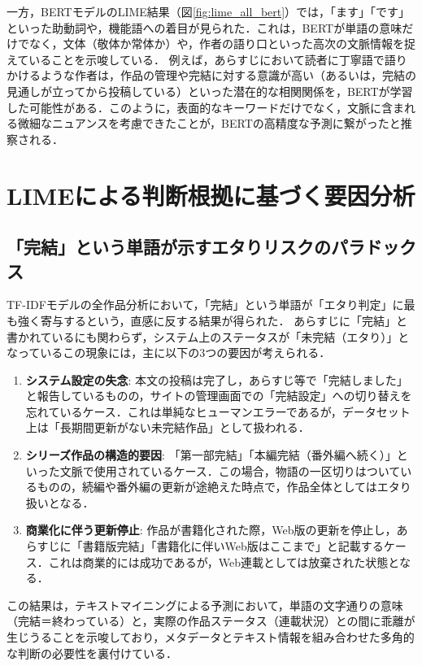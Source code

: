 \documentclass[uplatex, dvipdfmx, 11pt, a4paper, report]{jsbook}
\begin{document}
一方，BERTモデルのLIME結果（図\ref{fig:lime_all_bert}）では，「ます」「です」といった助動詞や，機能語への着目が見られた．これは，BERTが単語の意味だけでなく，文体（敬体か常体か）や，作者の語り口といった高次の文脈情報を捉えていることを示唆している．
例えば，あらすじにおいて読者に丁寧語で語りかけるような作者は，作品の管理や完結に対する意識が高い（あるいは，完結の見通しが立ってから投稿している）といった潜在的な相関関係を，BERTが学習した可能性がある．このように，表面的なキーワードだけでなく，文脈に含まれる微細なニュアンスを考慮できたことが，BERTの高精度な予測に繋がったと推察される．

\section{LIMEによる判断根拠に基づく要因分析}

\subsection{「完結」という単語が示すエタりリスクのパラドックス}
TF-IDFモデルの全作品分析において，「完結」という単語が「エタり判定」に最も強く寄与するという，直感に反する結果が得られた．
あらすじに「完結」と書かれているにも関わらず，システム上のステータスが「未完結（エタり）」となっているこの現象には，主に以下の3つの要因が考えられる．

\begin{enumerate}
    \item \textbf{システム設定の失念}: 
    本文の投稿は完了し，あらすじ等で「完結しました」と報告しているものの，サイトの管理画面での「完結設定」への切り替えを忘れているケース．これは単純なヒューマンエラーであるが，データセット上は「長期間更新がない未完結作品」として扱われる．
    \item \textbf{シリーズ作品の構造的要因}: 
    「第一部完結」「本編完結（番外編へ続く）」といった文脈で使用されているケース．この場合，物語の一区切りはついているものの，続編や番外編の更新が途絶えた時点で，作品全体としてはエタり扱いとなる．
    \item \textbf{商業化に伴う更新停止}: 
    作品が書籍化された際，Web版の更新を停止し，あらすじに「書籍版完結」「書籍化に伴いWeb版はここまで」と記載するケース．これは商業的には成功であるが，Web連載としては放棄された状態となる．
\end{enumerate}

この結果は，テキストマイニングによる予測において，単語の文字通りの意味（完結＝終わっている）と，実際の作品ステータス（連載状況）との間に乖離が生じうることを示唆しており，メタデータとテキスト情報を組み合わせた多角的な判断の必要性を裏付けている．
\end{document}
